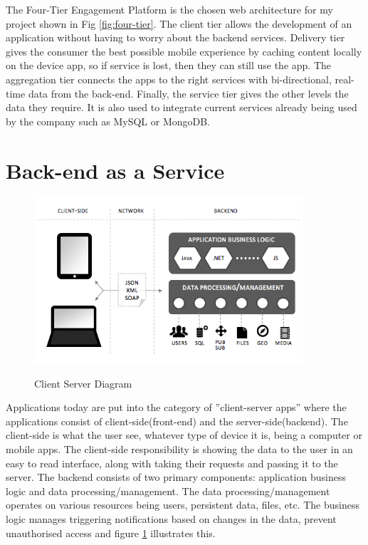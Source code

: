 \cite{MS07:phishing_filter}

The Four-Tier Engagement Platform is the chosen web architecture for my project shown in Fig \ref{fig:four-tier}. The client tier allows the development of an application without having to worry about the backend services. Delivery tier gives the consumer the best possible mobile experience by caching content locally on the device app, so if service is lost, then they can still use the app. The aggregation tier connects the apps to the right services with bi-directional, real-time data from the back-end. Finally, the service tier gives the other levels the data they require. It is also used to integrate current services already being used by the company such as MySQL or MongoDB.

\section{Back-end as a Service}

\begin{figure}[!h]
    \caption{Client Server Diagram \cite{backendless} }
    \centering
    \includegraphics[width=100mm]{images/client-server-diagram}
    \label{fig:client-server}
\end{figure}

Applications today are put into the category of ”client-server apps” where the applications consist of client-side(front-end) and the server-side(backend). The client-side is what the user see, whatever type of device it is, being a computer or mobile apps. The client-side responsibility is showing the data to the user in an easy to read interface, along with taking their requests and passing it to the server. The backend consists of two primary components: application business logic and data processing/management. The data processing/management operates on various resources being users, persistent data, files, etc. The business logic manages triggering notifications based on changes in the data, prevent unauthorised access and figure \ref{fig:client-server} illustrates this.

